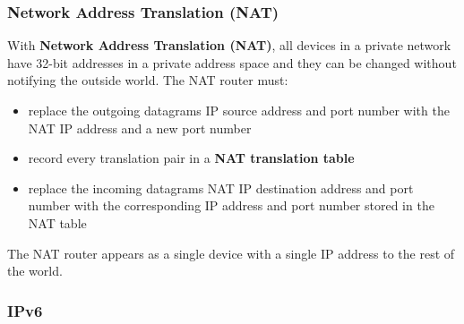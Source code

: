 \documentclass{article}
\begin{document}
\subsubsection{Network Address Translation (NAT)}
With \textbf{Network Address Translation (NAT)}, all devices in a private network have 32-bit addresses in a private address space and they can be changed without notifying the outside world. The NAT router must:
\begin{itemize}
    \item replace the outgoing datagrams IP source address and port number with the NAT IP address and a new port number
    \item record every translation pair in a \textbf{NAT translation table}
    \item replace the incoming datagrams NAT IP destination address and port number with the corresponding IP address and port number stored in the NAT table
\end{itemize}
The NAT router appears as a single device with a single IP address to the rest of the world.
\subsubsection{IPv6}
\end{document}
